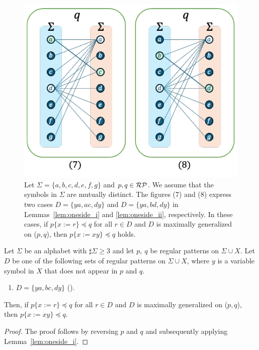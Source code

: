 \begin{figure}[t]
  \begin{center}
    \includegraphics[scale=0.525]{figs/lem6bigraph.pdf}
    \caption{Let $\Sigma=\{a,b,c,d,e,f,g\}$ and $p,q \in \mathcal{RP}$. We assume that the symbols in $\Sigma$ are mutually distinct.
    The figures (7) and (8) express two cases $D = \{ ya, ac, dy \}$ and $D = \{ ya, bd, dy \}$ in Lemmas~\ref{lem:oneside_i} and \ref{lem:oneside_ii}, respectively.
    In these cases, if $p \{ x := r \} \preceq q$ for all $r \in D$ and $D$ is maximally generalized on ($p,q$), then $p \{ x := xy \} \preceq q$ holds.}\label{fig:lem6bigraph}
  \end{center}
\end{figure}

\begin{lem}\label{lem:oneside_ii}
  Let $\Sigma$ be an alphabet with $\sharp\Sigma \ge 3$ and let $p,~q$ be regular patterns on $\Sigma\cup X$.
  Let $D$ be one of the following sets of regular patterns on $\Sigma\cup X$, where $y$ is a variable symbol in $X$ that does not appear in $p$ and $q$.
  \begin{enumerate}
  \item[] $D=\{ ya, bc, dy \}$ (\TheConditionC).
  \end{enumerate}
  Then, if $p \{ x := r \} \preceq q$ for all $r \in D$ and $D$ is maximally generalized on ($p,q$), then $p \{ x := xy \} \preceq q$.
\end{lem}

\begin{proof}
The proof follows by reversing $p$ and $q$ and subsequently applying Lemma~\ref{lem:oneside_i}.
\end{proof}

